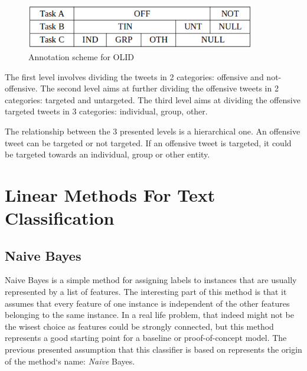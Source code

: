 \documentclass[12pt,a4paper]{report}
\begin{document}
\begin{figure}[H]
\centering
\includegraphics[width=10cm]{pics/OLID.png}
  \caption{Annotation scheme for OLID}
  \label{fig:OLID}
\end{figure}

The first level involves dividing the tweets in 2 categories: offensive and not-offensive.
The second level aims at further dividing the offensive tweets in 2 categories: targeted and untargeted.
The third level aims at dividing the offensive targeted tweets in 3 categories: individual, group, other.

The relationship between the 3 presented levels is a hierarchical one. An offensive tweet can be targeted or not targeted. If an offensive tweet is targeted, it could be targeted towards an individual, group or other entity.


\section{Linear Methods For Text Classification}

\subsection{Naive Bayes}
Naive Bayes is a simple method for assigning labels to instances that are usually represented by a list of features. The interesting part of this method is that it assumes that every feature of one instance is independent of the other features belonging to the same instance. In a real life problem, that indeed might not be the wisest choice as features could be strongly connected, but this method represents a good starting point for a baseline or proof-of-concept model. The previous presented assumption that this classifier is based on represents the origin of the method`s name: \textit{Naive} Bayes.
\end{document}
